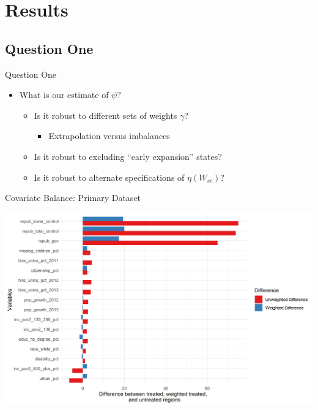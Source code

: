 \documentclass[hyperref={pdfpagelabels=false}]{beamer}
\begin{document}
\section{Results}

\subsection{Question One}

\begin{frame}{Question One}
    \begin{itemize}
        \item What is our estimate of $\psi$? \bigskip
        \begin{itemize}
            \item Is it robust to different sets of weights $\gamma$? \bigskip
            \begin{itemize}
                \item Extrapolation versus imbalances \bigskip
            \end{itemize}
            \item Is it robust to excluding ``early expansion'' states? \bigskip
            \item Is it robust to alternate specifications of $\eta(W_{sc})$? \bigskip
        \end{itemize}
    \end{itemize}
\end{frame}

\begin{frame}{Covariate Balance: Primary Dataset}
    \begin{center}
	\includegraphics[scale=0.5]{01_Plots/balance-plot-etuc1.png}
    \end{center}
\end{frame}
\end{document}
